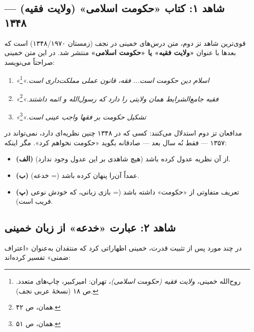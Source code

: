 \documentclass[12pt,a4paper]{book}
\newcommand{\keyword}[1]{\textbf{\textcolor{cPrimary}{#1}}}
\begin{document}
\subsection{شاهد ۱: کتاب «حکومت اسلامی» (ولایت فقیه) — ۱۳۴۸}

قوی‌ترین شاهد تز دوم، متن درس‌های خمینی در نجف (زمستان ۱۳۴۸/۱۹۷۰) است که بعدها با عنوان \keyword{«ولایت فقیه» یا «حکومت اسلامی»} منتشر شد. در این متن خمینی صراحتاً می‌نویسد:

\begin{warningBox}
\begin{enumerate}[label=\textcolor{cAccent}{\bfseries\arabic*.}, rightmargin=2em]
    \item \textit{«اسلام دین حکومت است... فقه، قانون عملی مملکت‌داری است.»}\footnote{روح‌الله خمینی، \textit{ولایت فقیه (حکومت اسلامی)}، تهران: امیرکبیر، چاپ‌های متعدد. ص ۱۸ (نسخهٔ عربی نجف).}

    \item \textit{«فقیه جامع‌الشرایط همان ولایتی را دارد که رسول‌الله و ائمه داشتند.»}\footnote{همان، ص ۴۲.}

    \item \textit{«تشکیل حکومت بر فقها واجب عینی است.»}\footnote{همان، ص ۵۱.}
\end{enumerate}
\end{warningBox}

مدافعان تز دوم استدلال می‌کنند: کسی که در ۱۳۴۸ چنین نظریه‌ای دارد، نمی‌تواند در ۱۳۵۷ — فقط نُه سال بعد — صادقانه بگوید «حکومت نخواهم کرد». مگر اینکه:

\begin{itemize}[label=\textcolor{cAccent}{$\bullet$}, rightmargin=2em]
    \item \textbf{(الف)} از آن نظریه عدول کرده باشد (هیچ شاهدی بر این عدول وجود ندارد).
    \item \textbf{(ب)} عمداً آن‌را پنهان کرده باشد (= خدعه).
    \item \textbf{(پ)} تعریف متفاوتی از «حکومت» داشته باشد (= بازی زبانی، که خودش نوعی فریب است).
\end{itemize}

\subsection{شاهد ۲: عبارت «خدعه» از زبان خمینی}

در چند مورد پس از تثبیت قدرت، خمینی اظهاراتی کرد که منتقدان به‌عنوان «اعتراف ضمنی» تفسیر کرده‌اند:
\end{document}
